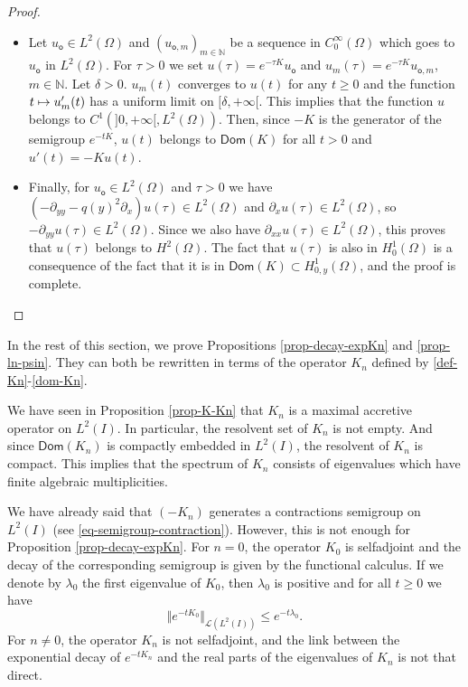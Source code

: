 \documentclass[10pt]{amsart}
\let\mathcal\mathscr
\def\mto{\mathchoice{\longmapsto}{\mapsto}{\mapsto}{\mapsto}}
\theoremstyle{plain}
\theoremstyle{definition}
\newcommand{\nr}[1]{\Vert #1\Vert}
\newcommand{\1}{\mathds 1}
\newcommand{\Dom}{\mathsf{Dom}}
\newcommand{\N}{\mathbb{N}}
\let\d\delta
\let\l\lambda
\let\O\Omega
\newcommand{\Lc}{{\mathcal L}}
\newcommand{\uo}{u_{\mathsf{o}}}
\newcommand{\uom}{u_{\mathsf{o},m}}
\begin{document}
\begin{proof}
\begin{itemize}
\item
Let $\uo \in L^2(\O)$ and $(\uom)_{m \in \N}$ be a sequence in $C_0^\infty(\O)$ which goes to $\uo$ in $L^2(\O)$. For $\tau > 0$ we set $u(\tau) = e^{-\tau K} \uo$ and $u_m(\tau) = e^{-\tau K} \uom$, $m \in \N$. Let $\d > 0$. $u_m(t)$ converges to $u(t)$ for any $t \geq 0$ and the function $t \mto u_m'(t)$ has a uniform limit on $[\d,+\infty[$. This implies that the function $u$ belongs to $C^1(]0,+\infty[,L^2(\O))$. Then, since $-K$ is the generator of the semigroup $e^{-tK}$, $u(t)$ belongs to $\Dom(K)$ for all $t > 0$ and $u'(t) = -K u(t)$.

\item
Finally, for $\uo \in L^2(\O)$ and $\tau > 0$ we have $(-\partial_{yy} - q(y)^2 \partial_x) u(\tau) \in L^2(\O)$ and $\partial_x u(\tau) \in L^2(\O)$, so $-\partial_{yy}u(\tau) \in L^2(\O)$. Since we also have $\partial_{xx}u(\tau) \in L^2(\O)$, this proves that $u(\tau)$ belongs to $H^2(\O)$. The fact that $u(\tau)$ is also in $H_0^1(\O)$ is a consequence of the fact that it is in $\Dom(K) \subset H^1_{0,y}(\O)$, and the proof is complete.\qedhere
\end{itemize}
\end{proof}


In the rest of this section, we prove Propositions \ref{prop-decay-expKn} and \ref{prop-ln-psin}. They can both be rewritten in terms of the operator $K_n$ defined by \eqref{def-Kn}-\eqref{dom-Kn}.

We have seen in Proposition \ref{prop-K-Kn} that $K_n$ is a maximal accretive operator on $L^2(I)$. In particular, the resolvent set of $K_n$ is not empty. And since $\Dom(K_n)$ is compactly embedded in $L^2(I)$, the resolvent of $K_n$ is compact. This implies that the spectrum of $K_n$ consists of eigenvalues which have finite algebraic multiplicities.

We have already said that $(-K_n)$ generates a contractions semigroup on $L^2(I)$ (see \eqref{eq-semigroup-contraction}). However, this is not enough for Proposition \ref{prop-decay-expKn}. For $n = 0$, the operator $K_0$ is selfadjoint and the decay of the corresponding semigroup is given by the functional calculus. If we denote by $\l_0$ the first eigenvalue of $K_0$, then $\l_0$ is positive and for all $t \geq 0$ we have
\[
\nr{e^{-t K_0}}_{\Lc(L^2(I))} \leq e^{-t\l_0}.
\]
For $n \neq 0$, the operator $K_n$ is not selfadjoint, and the link between the exponential decay of $e^{-tK_n}$ and the real parts of the eigenvalues of $K_n$ is not that direct.
\end{document}
